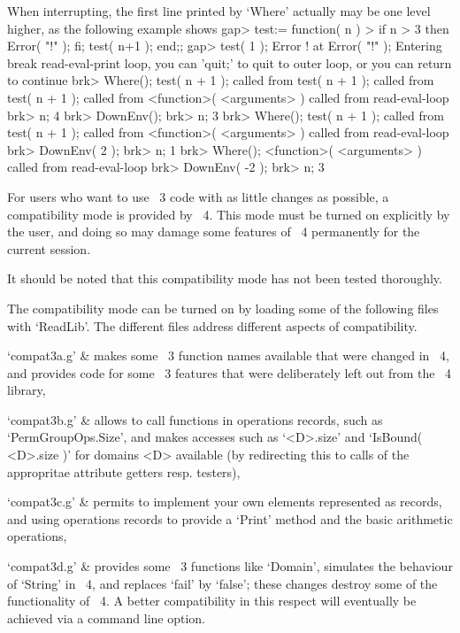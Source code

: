 When interrupting, the first line printed by `Where' actually may be
one level higher, as the following example shows
\begintt
    gap> test:= function( n )
    >    if n > 3 then Error( "!" ); fi; test( n+1 ); end;;
    gap> test( 1 );
    Error ! at
    Error( "!" );
    Entering break read-eval-print loop,
    you can 'quit;' to quit to outer loop,
    or you can return to continue
    brk> Where();
    test( n + 1 ); called from
    test( n + 1 ); called from
    test( n + 1 ); called from
    <function>( <arguments> ) called from read-eval-loop
    brk> n;
    4
    brk> DownEnv();
    brk> n;
    3
    brk> Where();
    test( n + 1 ); called from
    test( n + 1 ); called from
    <function>( <arguments> ) called from read-eval-loop
    brk> DownEnv( 2 );
    brk> n;
    1
    brk> Where();
    <function>( <arguments> ) called from read-eval-loop
    brk> DownEnv( -2 );
    brk> n;
    3
\endtt




For users who want to use {\GAP}~3 code with as little changes as
possible, a compatibility mode is provided by {\GAP}~4.
This mode must be turned on explicitly by the user,
and doing so may damage some features of {\GAP}~4 permanently
for the current session.

It should be noted that this compatibility mode has not been tested
thoroughly.

The compatibility mode can be turned on by loading some of the following
files with `ReadLib'.
The different files address different aspects of compatibility.

\beginitems
`compat3a.g' &
    makes some {\GAP}~3 function names available that were changed
    in {\GAP}~4,
    and provides code for some {\GAP}~3 features that were
    deliberately left out from the {\GAP}~4 library,

`compat3b.g' &
    allows to call functions in operations records, such as
    `PermGroupOps.Size',
    and makes accesses such as `<D>.size' and `IsBound( <D>.size )'
    for domains <D> available (by redirecting this to calls of the
    appropritae attribute getters resp. testers),

`compat3c.g' &
    permits to implement your own elements represented as records,
    and using operations records to provide a `Print' method and
    the basic arithmetic operations,

`compat3d.g' &
    provides some {\GAP}~3 functions like `Domain', simulates the
    behaviour of `String' in {\GAP}~4, and replaces `fail' by `false';
    these changes destroy some of the functionality of {\GAP}~4.
    A better compatibility in this respect will eventually be achieved
    via a command line option.
\enditems


